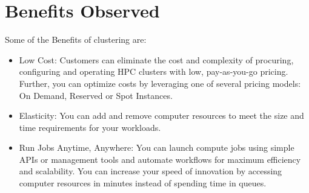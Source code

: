 \chapter{Benefits Observed}

Some of the Benefits of clustering are:
\begin{itemize}
\item Low Cost: Customers can eliminate the cost and complexity of procuring, configuring and operating HPC clusters with low, pay-as-you-go pricing. Further, you can optimize costs by leveraging one of several pricing models: On Demand, Reserved or Spot Instances.

\item Elasticity: You can add and remove computer resources to meet the size and time requirements for your workloads.

\item Run Jobs Anytime, Anywhere: You can launch compute jobs using simple APIs or management tools and automate workflows for maximum efficiency and scalability. You can increase your speed of innovation by accessing computer resources in minutes instead of spending time in queues.
\end{itemize}
